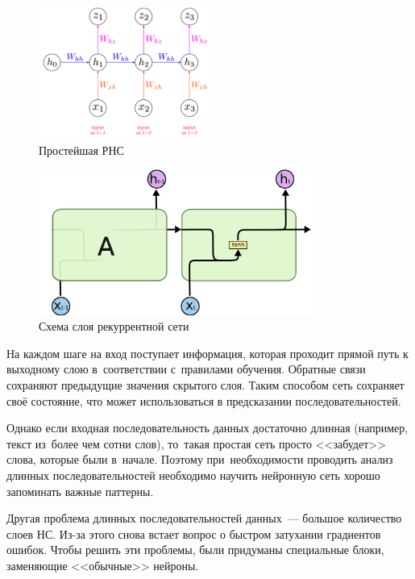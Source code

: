 \begin{figure}[!h]
	\centering
	\includegraphics[width=0.5\textwidth]{pics/simple_rnn}
	\caption{Простейшая РНС}
	\label{simple_rnn}
\end{figure}

\begin{figure}[!h]
	\centering
	\includegraphics[width=0.8\textwidth]{pics/RNN_layer}
	\caption{Схема слоя рекуррентной сети}
	\label{RNN_layer}
\end{figure}

На каждом шаге на вход поступает информация, которая проходит прямой путь к выходному слою 
в~соответствии с~правилами обучения. Обратные связи сохраняют предыдущие значения 
скрытого слоя. Таким способом сеть сохраняет своё состояние, что может использоваться в предсказании 
последовательностей.

Однако если входная последовательность данных достаточно длинная (например, текст из~более чем сотни слов), то~такая простая сеть просто <<забудет>> слова, которые были в~начале. Поэтому при~необходимости
проводить анализ длинных последовательностей необходимо научить нейронную сеть хорошо запоминать
важные паттерны.

Другая проблема длинных последовательностей данных~--- большое количество слоев НС. Из-за этого
снова встает вопрос о быстром затухании градиентов ошибок. 
Чтобы решить эти проблемы, были придуманы специальные блоки, заменяющие <<обычные>> нейроны.

